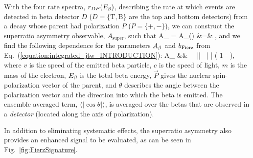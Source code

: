 With the four rate spectra, $r_{D P}(E_{\beta})$, describing the rate at which events are detected in beta detector $D$ ($D =\{ \mathrm{T, B}  \}$ are the top and bottom detectors) from a decay whose parent had polarization $P$ ($P=\{+,-\}$), we can construct the superratio asymmetry observable, $A_{\mathrm{super}}$, such that
\bea
A_{} \;\;=\;\; A_{}(\Ebeta) 
&=& ,
\eea
and we find the following dependence for the parameters $A_{\beta}$ and $b_{\mathrm{Fierz}}$ from Eq.~(\ref{equation:integrated_jtw_INTRODUCTION}):
\bea
A_{} &\approx& \Abeta \,  \, || \, \langle | \cos\theta | \rangle \left( 1 - \bFierz {} \right), 
\eea
where $v$ is the speed of the emitted beta particle, $c$ is the speed of light, $m$ is the mass of the electron, $E_{\beta}$ is the total beta energy, $\vec{P}$ gives the nuclear spin-polarization vector of the parent, and $\theta$ describes the angle between the polarization vector and the direction into which the beta is emitted.  The ensemble averaged term, $\langle | \cos\theta | \rangle$, is averaged over the betas that are observed in a \emph{detector} (located along the axis of polarization).

In addition to eliminating systematic effects, the superratio asymmetry also provides an enhanced signal to be evaluated, as can be seen in Fig.~\ref{fig:FierzSignature}.

